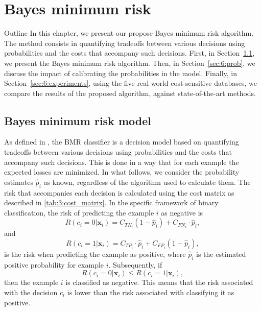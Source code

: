 \chapter{Bayes minimum risk}\label{ch:6}

\begin{remark}{Outline}
In this chapter, we present our propose Bayes minimum risk algorithm. The method 
consists in quantifying tradeoffs between various decisions using probabilities and the costs that 
accompany such decisions. First, in Section~\ref{sec:6:bmr}, we present the Bayes minimum risk 
algorithm. Then, in Section~\ref{sec:6:prob}, we discuss the impact of calibrating the probabilities 
in the model. Finally, in Section~\ref{sec:6:experiments},  using the five real-world cost-sensitive 
databases, we compare the results of the proposed algorithm, against state-of-the-art methods.
\end{remark}


\section{Bayes minimum risk model}
\label{sec:6:bmr}


As defined in \citep{Ghosh2006}, the BMR classifier is a decision model based on quantifying 
tradeoffs between various decisions using probabilities and the costs that accompany such decisions. 
This is done in a way that for each example the expected losses are minimized. In  what follows, we 
consider the probability estimates $\hat p_i$ as known, regardless of the algorithm used to 
calculate them.  The risk that accompanies each decision is calculated using the cost matrix 
as described in \tablename{ \ref{tab:3:cost_matrix}}. In the specific framework of binary 
classification, the risk of predicting the example $i$ as negative is 
\begin{equation}
  R(c_i=0|\mathbf{x}_i)=C_{TN_i}(1-\hat p_i)+C_{FN_i} \cdot \hat p_i, 
\end{equation}
and
\begin{equation}
  R(c_i=1|\mathbf{x}_i)=C_{TP_i} \cdot \hat p_i + C_{FP_i}(1- \hat p_i), 
\end{equation}
is the risk when predicting the example as positive, where $\hat p_i$ is the estimated positive 
probability for example $i$. Subsequently, if 
\begin{equation}
  R(c_i=0|\mathbf{x}_i) \le R(c_i=1|\mathbf{x}_i), 
\end{equation}
then  the example $i$ is classified as negative. This means that the risk associated with the 
decision $c_i$ is lower than the risk associated with classifying it as positive. 


